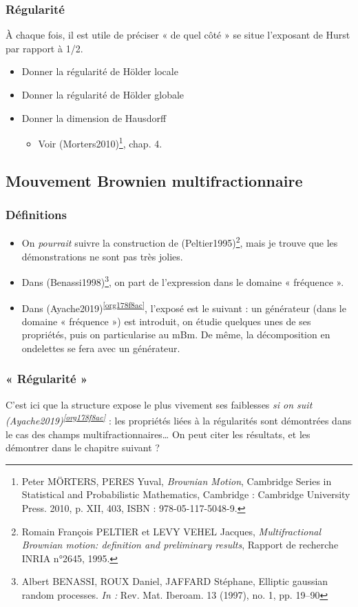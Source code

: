 \documentclass[11pt]{article}
\begin{document}
\subsubsection{Régularité}
\label{sec:org6388444}
À chaque fois, il est utile de préciser « de quel côté » se situe
l'exposant de Hurst par rapport à 1/2.
\begin{itemize}
\item Donner la régularité de Hölder locale
\item Donner la régularité de Hölder globale
\item Donner la dimension de Hausdorff
\begin{itemize}
\item Voir (Morters2010)\footnote{Peter MÖRTERS, PERES Yuval, \emph{Brownian Motion}, Cambridge Series
in Statistical and Probabilistic Mathematics, Cambridge : Cambridge
University Press. 2010, p. XII, 403, ISBN : 978-05-117-5048-9.}, chap. 4.
\end{itemize}
\end{itemize}
\subsection{Mouvement Brownien multifractionnaire}
\label{sec:org571b575}
\subsubsection{Définitions}
\label{sec:orgb14ad7b}
\begin{itemize}
\item On \emph{pourrait} suivre la construction de (Peltier1995)\footnote{Romain François PELTIER et LEVY VEHEL Jacques, \emph{Multifractional
Brownian motion: definition and preliminary results}, Rapport de
recherche INRIA n°2645, 1995.}, mais je
trouve que les démonstrations ne sont pas très jolies.
\item Dans (Benassi1998)\footnote{Albert BENASSI, ROUX Daniel, JAFFARD Stéphane, Elliptic gaussian
random processes. \emph{In :} Rev. Mat. Iberoam. 13 (1997), no. 1,
pp. 19–90}, on part de l'expression dans le domaine «
fréquence ».
\item Dans (Ayache2019)\textsuperscript{\ref{org178f8ac}}, l'exposé est le suivant : un générateur
(dans le domaine « fréquence ») est introduit, on étudie quelques
unes de ses propriétés, puis on particularise au mBm. De même, la
décomposition en ondelettes se fera avec un générateur.
\end{itemize}
\subsubsection{« Régularité »}
\label{sec:org649f863}
C'est ici que la structure expose le plus vivement ses faiblesses \emph{si
on suit (Ayache2019)\textsuperscript{\ref{org178f8ac}}} : les propriétés liées à la régularités
sont démontrées dans le cas des champs multifractionnaires\ldots{} On peut
citer les résultats, et les démontrer dans le chapitre suivant ?
\end{document}
